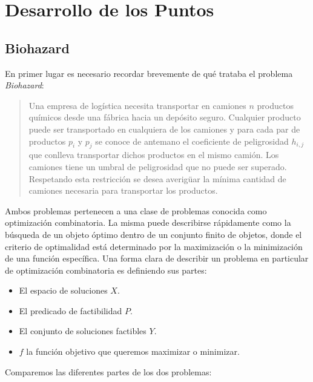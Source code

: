 \section{Desarrollo de los Puntos}

\subsection{Biohazard}
En primer lugar es necesario recordar brevemente de qué trataba el problema \emph{Biohazard}:
\begin{quotation}
  Una empresa de logística necesita transportar en camiones $n$ productos químicos desde una fábrica
  hacia un depósito seguro. Cualquier producto puede ser transportado en cualquiera de los camiones
  y para cada par de productos $p_i$ y $p_j$ se conoce de antemano el coeficiente de peligrosidad $h_{i,j}$
  que conlleva transportar dichos productos en el mismo camión. Los camiones tiene un umbral de peligrosidad
  que no puede ser superado. Respetando esta restricción se desea averigüar la mínima cantidad de camiones
  necesaria para transportar los productos.
\end{quotation}
Ambos problemas pertenecen a una clase de problemas conocida como optimización combinatoria. La misma
puede describirse rápidamente como la búsqueda de un objeto óptimo dentro de un conjunto finito de objetos,
donde el criterio de optimalidad está determinado por la maximización o la minimización de una función
específica. Una forma clara de describir un problema en particular de optimización combinatoria es
definiendo sus partes:
\begin{itemize}
  \item El espacio de soluciones $X$.
  \item El predicado de factibilidad $P$.
  \item El conjunto de soluciones factibles $Y$.
  \item $f$ la función objetivo que queremos maximizar o minimizar.
\end{itemize}

Comparemos las diferentes partes de los dos problemas:

